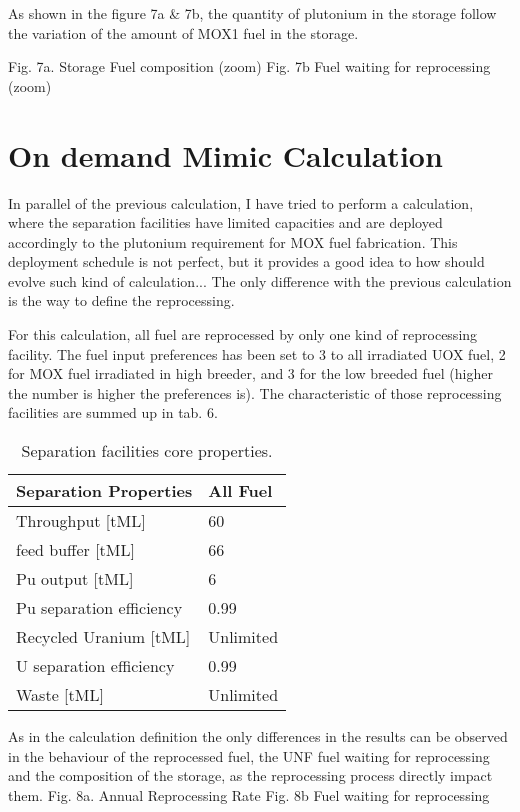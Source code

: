 \documentclass[12pt]{article}
\begin{document}
As shown in the figure 7a \& 7b, the quantity of plutonium in the storage follow the variation of the amount of MOX1 fuel in the storage.
	

Fig. 7a. Storage Fuel composition (zoom)		Fig. 7b Fuel waiting for reprocessing (zoom)		 

\section{On demand Mimic Calculation}
In parallel of the previous calculation, I have tried to perform a calculation, where the separation facilities have limited capacities and are deployed accordingly to the plutonium requirement for MOX fuel fabrication. This deployment schedule is not perfect, but it provides a good idea to how should evolve such kind of calculation... 
The only difference with the previous calculation is the way to define the reprocessing.

For this calculation, all fuel are reprocessed by only one kind of reprocessing facility. The fuel input preferences has been set to 3 to all irradiated UOX fuel, 2 for MOX fuel irradiated in high breeder, and 3 for the low breeded fuel (higher the number is higher the preferences is). The characteristic of those reprocessing facilities are summed up in tab. 6.

\begin{table}[h!]
\centering
\begin{tabular}{ll}
\hline
Separation Properties	&	All Fuel	\\
\hline 
Throughput [tML]		&	60		\\
feed buffer [tML]		&	66		\\
Pu output  [tML]		&	6		\\
Pu separation efficiency	&	0.99		\\
Recycled Uranium [tML]	&	Unlimited	\\
U separation efficiency	&	0.99		\\
Waste [tML]			&	Unlimited	\\
\hline
\end{tabular}
\caption{Separation facilities core properties.}
\label{tab:fuelfab_1}
\end{table}


As in the calculation definition the only differences in the results can be observed in the behaviour of the reprocessed fuel, the UNF fuel waiting for reprocessing and the composition of the storage, as the reprocessing process directly impact them.
Fig. 8a. Annual Reprocessing Rate				Fig. 8b Fuel waiting for reprocessing
\end{document}
